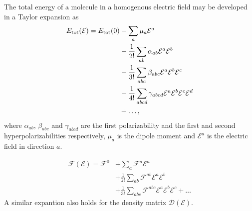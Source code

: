 \documentclass[prl,aps,twocolumn,showpacs,twocolumngrid,superbib]{revtex4}
\def\F{\mathcal{F}}
\def\D{\mathcal{D}}
\def\E{\mathcal{E}}
\begin{document}
The total energy of a molecule in a homogenous electric field may 
be developed in a Taylor expansion as
\begin{equation}
  \begin{split}
    E_{\rm tot}(\E)= E_{\rm tot}(0) 
    &-\sum_a\mu_a\E^a\\
    &-\frac{1}{2!}\sum_{ab}\alpha_{ab}\E^a\E^b\\
    &-\frac{1}{3!}\sum_{abc}\beta_{abc}\E^a\E^b\E^c\\
    &-\frac{1}{4!}\sum_{abcd}\gamma_{abcd}\E^a\E^b\E^c\E^d\\
    &+\dots,
  \end{split}
\end{equation}
 where $\alpha_{ab}$, $\beta_{abc}$ and $\gamma_{abcd}$ are 
 the first polarizability and the first and second 
 hyperpolarizabilities respectively, $\mu_a$ is the dipole 
 moment and $\E^a$ is the electric field in direction $a$. 

\begin{equation}
  \begin{split}
    \F(\E)=\F^{0} & +\sum_a \F^{a}\E^{a}\\
    &+\frac{1}{2!}\sum_{ab} \F^{ab}\E^{a}\E^{b}\\
    &+\frac{1}{3!}\sum_{abc} \F^{abc}\E^{a}\E^{b}\E^{c}+\dots
  \end{split}
\end{equation}
A similar expantion also holds for the density matrix $\D(\E)$.
\end{document}
